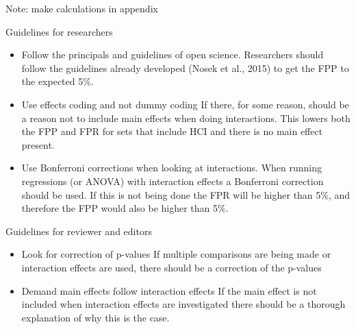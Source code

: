 Note: make calculations in appendix


Guidelines for researchers 
\begin{itemize}
\item Follow the principals and guidelines of open science.
Researchers should follow the guidelines already developed (Nosek et al., 2015) to get the FPP to the expected 5\%.
\item Use effects coding and not dummy coding
If there, for some reason, should be a reason not to include main effects when doing interactions. This lowers both the FPP and FPR for sets that include HCI and there is no main effect present.
\item Use Bonferroni corrections when looking at interactions. When running regressions (or ANOVA) with interaction effects a Bonferroni correction should be used. If this is not being done the FPR will be higher than 5\%, and therefore the FPP would also be higher than 5\%.
\end{itemize}


Guidelines for reviewer and editors
\begin{itemize}
\item Look for correction of p-values
If multiple comparisons are being made or interaction effects are used, there should be a correction of the p-values
\item Demand main effects follow interaction effects
If the main effect is not included when interaction effects are investigated there should be a thorough explanation of why this is the case.
\end{itemize}
 
